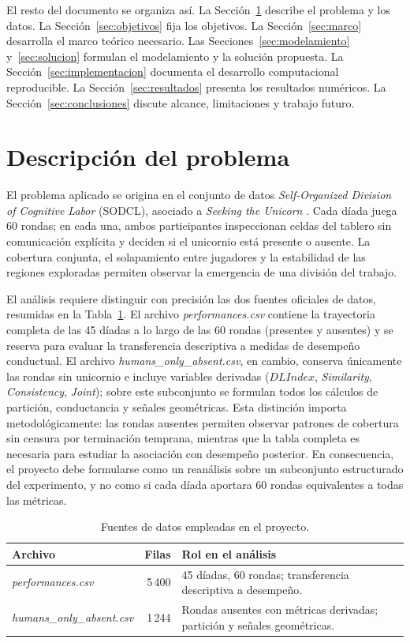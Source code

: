 \documentclass[journal]{IEEEtran}
\begin{document}
El resto del documento se organiza así. La Sección~\ref{sec:problema} describe el problema y los datos. La Sección~\ref{sec:objetivos} fija los objetivos. La Sección~\ref{sec:marco} desarrolla el marco teórico necesario. Las Secciones~\ref{sec:modelamiento} y~\ref{sec:solucion} formulan el modelamiento y la solución propuesta. La Sección~\ref{sec:implementacion} documenta el desarrollo computacional reproducible. La Sección~\ref{sec:resultados} presenta los resultados numéricos. La Sección~\ref{sec:conclusiones} discute alcance, limitaciones y trabajo futuro.

\section{Descripción del problema}\label{sec:problema}

El problema aplicado se origina en el conjunto de datos \emph{Self-Organized Division of Cognitive Labor} (SODCL), asociado a \emph{Seeking the Unicorn} \cite{andrade2021}. Cada díada juega 60 rondas; en cada una, ambos participantes inspeccionan celdas del tablero sin comunicación explícita y deciden si el unicornio está presente o ausente. La cobertura conjunta, el solapamiento entre jugadores y la estabilidad de las regiones exploradas permiten observar la emergencia de una división del trabajo.

El análisis requiere distinguir con precisión las dos fuentes oficiales de datos, resumidas en la Tabla~\ref{tab:datasets}. El archivo \emph{performances.csv} contiene la trayectoria completa de las 45 díadas a lo largo de las 60 rondas (presentes y ausentes) y se reserva para evaluar la transferencia descriptiva a medidas de desempeño conductual. El archivo \emph{humans\_only\_absent.csv}, en cambio, conserva únicamente las rondas sin unicornio e incluye variables derivadas ($DLIndex$, \emph{Similarity}, \emph{Consistency}, \emph{Joint}); sobre este subconjunto se formulan todos los cálculos de partición, conductancia y señales geométricas. Esta distinción importa metodológicamente: las rondas ausentes permiten observar patrones de cobertura sin censura por terminación temprana, mientras que la tabla completa es necesaria para estudiar la asociación con desempeño posterior. En consecuencia, el proyecto debe formularse como un reanálisis sobre un subconjunto estructurado del experimento, y no como si cada díada aportara 60 rondas equivalentes a todas las métricas.

\begin{table}[t]
\centering
\footnotesize
\caption{Fuentes de datos empleadas en el proyecto.}
\label{tab:datasets}
\begin{tabular}{@{}lrp{}@{}}
\toprule
\textbf{Archivo} & \textbf{Filas} & \textbf{Rol en el análisis} \\
\midrule
\emph{performances.csv} & 5\,400 & 45 díadas, 60 rondas; transferencia descriptiva a desempeño. \\
\addlinespace
\emph{humans\_only\_absent.csv} & 1\,244 & Rondas ausentes con métricas derivadas; partición y señales geométricas. \\
\bottomrule
\end{tabular}
\end{table}
\end{document}

